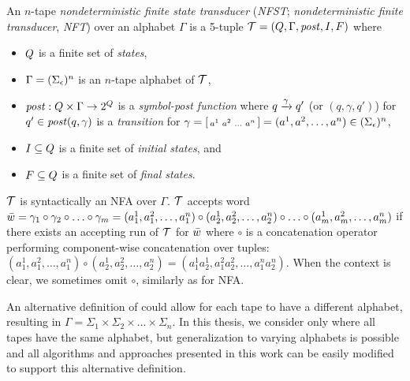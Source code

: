 \begin{definition} \hfill \newline
An $n$-tape \emph{nondeterministic finite state transducer} (\emph{NFST}; \emph{nondeterministic finite transducer}, \emph{NFT}) over an alphabet $\Gamma$ is a 5-tuple $\mathcal{T} = (Q, \Gamma, \mathit{post}, I, F)$ where
\begin{itemize}
    \item $Q$ is a finite set of \emph{states},
    \item $\Gamma = (\Sigma_\epsilon)^n$ is an $n$-tape alphabet of $\mathcal{T}$,
    \item $\mathit{post}: Q \times \Gamma \rightarrow 2^{Q}$ is a \emph{symbol-post function}
    where ${q} \xrightarrow{{\gamma}} {q'}$ (or $(q, \gamma, q')$) for
    \\$q' \in \mathit{post}(q, \gamma)$ is a \emph{transition} for $\gamma = \begin{bsmallmatrix} a^1 & a^2 & \ldots & a^n\end{bsmallmatrix} = (a^1, a^2, \ldots, a^n) \in (\Sigma_\epsilon)^n$,
    \item $I \subseteq Q$ is a finite set of \emph{initial states}, and
    \item $F \subseteq Q$ is a finite set of \emph{final states}.
\end{itemize}
\end{definition}

\nft $\mathcal{T}$ is syntactically an NFA over $\Gamma$.
$\mathcal{T}$ accepts word $\bar{{w}} = \gamma_1 \circ \gamma_2 \circ \ldots \circ \gamma_m = (a^1_1, a^2_1, \ldots, a^n_1) \circ (a^1_2, a^2_2, \ldots, a^n_2) \circ \ldots \circ (a^1_m, a^2_m, \ldots, a^n_m) $
 if there exists an accepting run of $\mathcal{T}$ for $\bar{{w}}$ where $\circ$ is a concatenation operator performing component-wise concatenation over tuples:
$(a^1_1, a^2_1, \ldots, a^n_1) \circ (a^1_2, a^2_2, \ldots, a^n_2) = (a^1_1a^1_2, a^2_1a^2_2, \ldots, a^n_1a^n_2)$.
When the context is clear, we sometimes omit $\circ$, similarly as for NFA.

An alternative definition of \nfts could allow for each tape to have a different alphabet, resulting in $\Gamma = \Sigma_1 \times \Sigma_2 \times \ldots \times \Sigma_n$.
In this thesis, we consider only \nfts where all tapes have the same alphabet, but generalization to varying alphabets is possible and all algorithms and approaches presented in this work can be easily modified to support this alternative definition.

